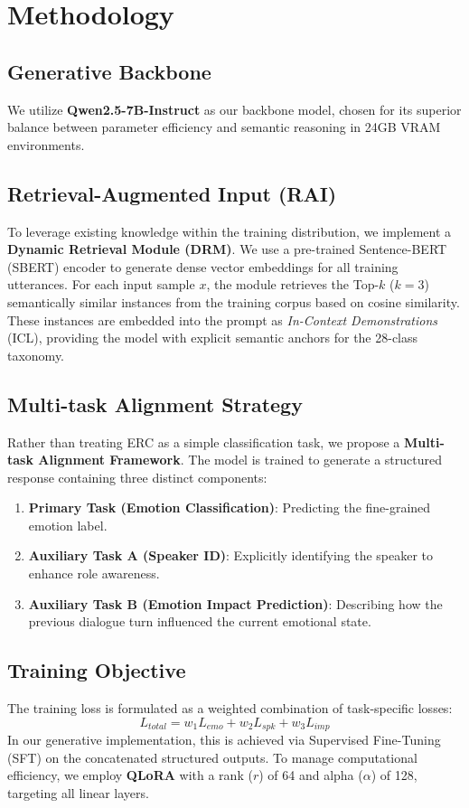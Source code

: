 \documentclass[11pt]{article}
\begin{document}
\section{Methodology}
\subsection{Generative Backbone}
We utilize \textbf{Qwen2.5-7B-Instruct} as our backbone model, chosen for its superior balance between parameter efficiency and semantic reasoning in 24GB VRAM environments.

\subsection{Retrieval-Augmented Input (RAI)}
To leverage existing knowledge within the training distribution, we implement a \textbf{Dynamic Retrieval Module (DRM)}. We use a pre-trained Sentence-BERT (SBERT) encoder to generate dense vector embeddings for all training utterances. For each input sample $x$, the module retrieves the Top-$k$ ($k=3$) semantically similar instances from the training corpus based on cosine similarity. These instances are embedded into the prompt as \textit{In-Context Demonstrations} (ICL), providing the model with explicit semantic anchors for the 28-class taxonomy.

\subsection{Multi-task Alignment Strategy}
Rather than treating ERC as a simple classification task, we propose a \textbf{Multi-task Alignment Framework}. The model is trained to generate a structured response containing three distinct components:
\begin{enumerate}
    \item \textbf{Primary Task (Emotion Classification)}: Predicting the fine-grained emotion label.
    \item \textbf{Auxiliary Task A (Speaker ID)}: Explicitly identifying the speaker to enhance role awareness.
    \item \textbf{Auxiliary Task B (Emotion Impact Prediction)}: Describing how the previous dialogue turn influenced the current emotional state.
\end{enumerate}

\subsection{Training Objective}
The training loss is formulated as a weighted combination of task-specific losses:
\begin{equation}
L_{total} = w_1 L_{emo} + w_2 L_{spk} + w_3 L_{imp}
\end{equation}
In our generative implementation, this is achieved via Supervised Fine-Tuning (SFT) on the concatenated structured outputs. To manage computational efficiency, we employ \textbf{QLoRA} with a rank ($r$) of 64 and alpha ($\alpha$) of 128, targeting all linear layers.
\end{document}
